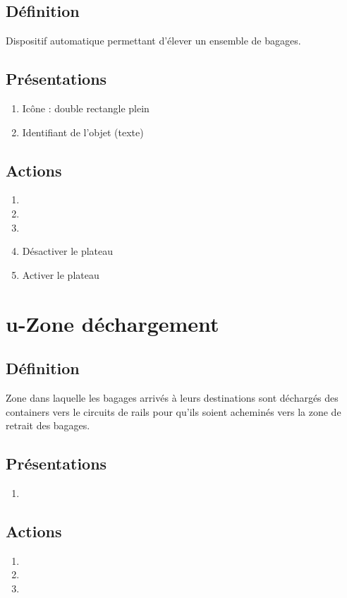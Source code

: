 \subsection{Définition}
	Dispositif automatique permettant d'élever un ensemble de bagages.

\subsection{Présentations}
\begin{enumerate}
	\item Icône : double rectangle plein
	\item Identifiant de l'objet (texte)
\end{enumerate}

\subsection{Actions}
\begin{enumerate}
	\item {}
	\item {}
	\item \etat
	\item Désactiver le plateau
	\item Activer le plateau
\end{enumerate}

\section{u-Zone déchargement}
\subsection{Définition}
	Zone dans laquelle les bagages arrivés à leurs destinations sont déchargés des containers vers le circuits de rails pour
	qu'ils soient acheminés vers la zone de retrait des bagages.

\subsection{Présentations}
\begin{enumerate}
	\item \rectetiquette
\end{enumerate}

\subsection{Actions}
\begin{enumerate}
	\item {}
	\item {}
	\item \transit
\end{enumerate}

